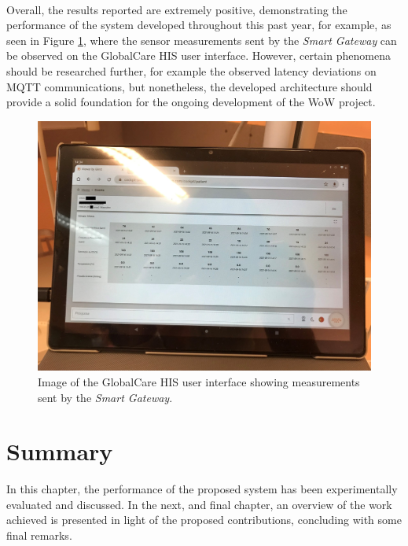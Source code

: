\paragraph{} Overall, the results reported are extremely positive, demonstrating the performance of the system developed throughout this past year, for example, as seen in Figure \ref{fig:glintt-viewer}, where the sensor measurements sent by the \textit{Smart Gateway} can be observed on the GlobalCare \acs{HIS} user interface. However, certain phenomena should be researched further, for example the observed latency deviations on \acs{MQTT} communications, but nonetheless, the developed architecture should provide a solid foundation for the ongoing development of the \acs{WoW} project.

\begin{figure}[H]
    \centering
    \includegraphics[width=.85\linewidth]{images/hospital-viewer.jpg}
    \caption{Image of the GlobalCare \acs{HIS} user interface showing measurements sent by the \textit{Smart Gateway}.}
    \label{fig:glintt-viewer}
\end{figure}

\section{Summary}
In this chapter, the performance of the proposed system has been experimentally evaluated and discussed. 
In the next, and final chapter, an overview of the work achieved is presented in light of the proposed contributions, concluding with some final remarks.